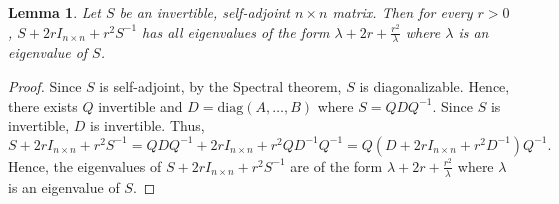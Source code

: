 \documentclass[11pt, reqno]{amsart}
\newtheorem{lemma}[theorem]{Lemma}
\numberwithin{equation}{section}
\begin{document}
\begin{lemma}\label{lem: newEigenvalues}
    Let $S$ be an invertible, self-adjoint $n\times n$ matrix. Then for every $r>0$, $S+2rI_{n\times n}+r^2S^{-1}$ has all eigenvalues of the form $\lambda+2r+\frac{r^2}{\lambda}$ where $\lambda$ is an eigenvalue of $S$.  
\end{lemma}

\begin{proof}
    Since $S$ is self-adjoint, by the Spectral theorem, $S$ is diagonalizable. Hence, there exists $Q$ invertible and $D= \text{diag}(A, \dots, B)$ where $S= QDQ^{-1}.$ Since $S$ is invertible, $D$ is invertible. Thus, $$S+2rI_{n\times n}+r^2S^{-1}= QDQ^{-1}+2rI_{n\times n}+r^2QD^{-1}Q^{-1}= Q(D+2rI_{n\times n}+r^2D^{-1})Q^{-1}.$$ Hence, the eigenvalues of $S+2rI_{n\times n}+r^2S^{-1}$ are of the form $\lambda+2r+\frac{r^2}{\lambda}$ where $\lambda$ is an eigenvalue of $S$.
\end{proof}
\end{document}
